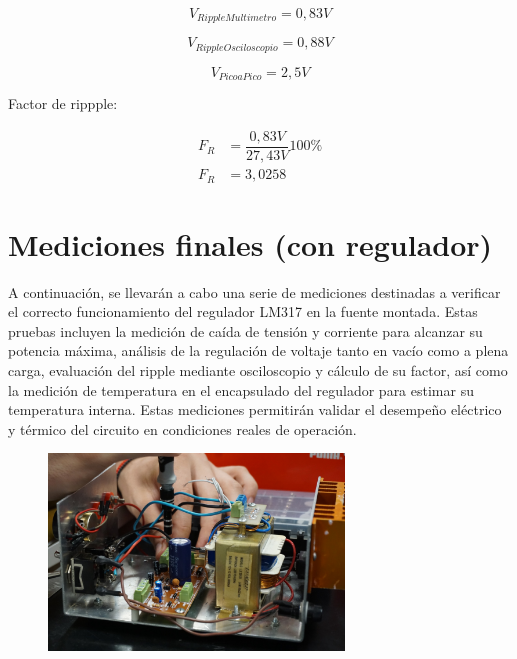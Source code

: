 \begin{equation}
  V_{RippleMultimetro} = 0,83 V
\end{equation}

\begin{equation}
  V_{RippleOsciloscopio} = 0,88 V
\end{equation}

\begin{equation}
  V_{PicoaPico} = 2,5 V
\end{equation}

Factor de rippple:

\begin{equation}
  \begin{aligned}
    F_R &= \dfrac{0,83 V}{27,43 V} 100\percent\\
    F_R &= 3,0258
  \end{aligned}
\end{equation}


\section{Mediciones finales (con regulador)}

A continuación, se llevarán a cabo una serie de mediciones destinadas a verificar el correcto funcionamiento del regulador LM317 en la
fuente montada. Estas pruebas incluyen la medición de caída de tensión y corriente para alcanzar su potencia máxima, análisis de la
regulación de voltaje tanto en vacío como a plena carga, evaluación del ripple mediante osciloscopio y cálculo de su factor, así como la
medición de temperatura en el encapsulado del regulador para estimar su temperatura interna. Estas mediciones permitirán validar el
desempeño eléctrico y térmico del circuito en condiciones reales de operación.

\begin{figure}[h]
  \centering
  \includegraphics[width=0.70\textwidth]{images/placaMontada.png}
\end{figure}

